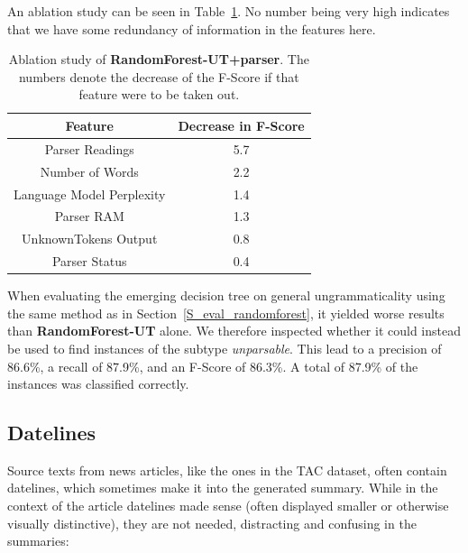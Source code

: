 \documentclass[a4paper,10pt]{scrartcl}
\theoremstyle{style}
\begin{document}
An ablation study can be seen in Table~\ref{ablation_study_randomforest}. No number being very high indicates that we have some redundancy of information in the features here.
\begin{table}
\begin{center}
\begin{tabular}{c|c}
  \hline\hline
  Feature & Decrease in F-Score\\%
  \hline
  Parser Readings & 5.7\\%
  Number of Words & 2.2\\%
  Language Model Perplexity & 1.4\\%
  Parser RAM & 1.3\\%
  UnknownTokens Output & 0.8\\%
  Parser Status & 0.4\\%
  \hline\hline
  \end{tabular}
  \end{center}

  \caption{Ablation study of \textbf{RandomForest-UT+parser}. The numbers denote the decrease of the F-Score if that feature were to be taken out.}
  \label{ablation_study_randomforest}
 \end{table}

When evaluating the emerging decision tree on general ungrammaticality using the same method as in Section~\ref{S_eval_randomforest}, it yielded worse results than \textbf{RandomForest-UT} alone. We therefore inspected whether it could instead be used to find instances of the subtype \textit{unparsable}. This lead to a precision of 86.6\%, a recall of 87.9\%, and an F-Score of 86.3\%. A total of 87.9\% of the instances was classified correctly.

\subsection{Datelines}
Source texts from news articles, like the ones in the TAC dataset, often contain datelines, which sometimes make it into the generated summary. While in the context of the article datelines made sense (often displayed smaller or otherwise visually distinctive), they are not needed, distracting and confusing in the summaries:
\end{document}

